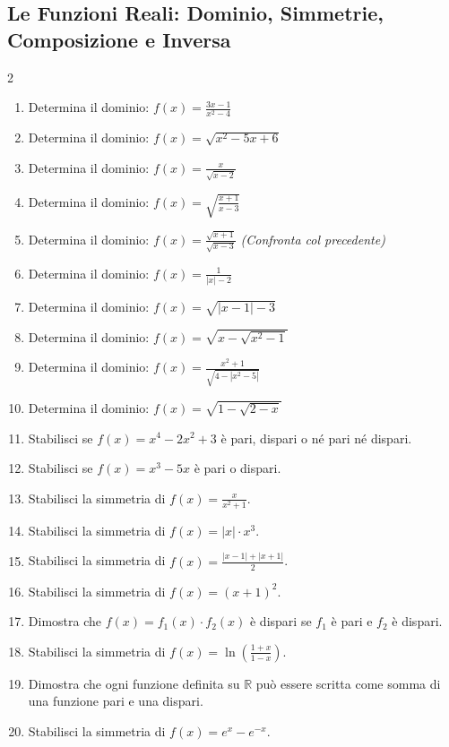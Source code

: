 \subsection{Le Funzioni Reali: Dominio, Simmetrie, Composizione e Inversa}
\begin{multicols}{2}
\begin{enumerate}
    \item {} Determina il dominio: $f(x) = \frac{3x - 1}{x^2 - 4}$
    \item {} Determina il dominio: $f(x) = \sqrt{x^2 - 5x + 6}$
    \item {} Determina il dominio: $f(x) = \frac{x}{\sqrt{x - 2}}$
    \item {} Determina il dominio: $f(x) = \sqrt{\frac{x + 1}{x - 3}}$
    \item {} Determina il dominio: $f(x) = \frac{\sqrt{x+1}}{\sqrt{x-3}}$ \textit{(Confronta col precedente)}
    \item {} Determina il dominio: $f(x) = \frac{1}{|x| - 2}$
    \item {} Determina il dominio: $f(x) = \sqrt{|x-1| - 3}$
    \item {} Determina il dominio: $f(x) = \sqrt{x - \sqrt{x^2 - 1}}$
    \item {} Determina il dominio: $f(x) = \frac{x^2+1}{\sqrt{4 - |x^2-5|}}$
    \item {} Determina il dominio: $f(x) = \sqrt{1 - \sqrt{2 - x}}$
    
    \item {} Stabilisci se $f(x) = x^4 - 2x^2 + 3$ è pari, dispari o né pari né dispari.
    \item {} Stabilisci se $f(x) = x^3 - 5x$ è pari o dispari.
    \item {} Stabilisci la simmetria di $f(x) = \frac{x}{x^2 + 1}$.
    \item {} Stabilisci la simmetria di $f(x) = |x| \cdot x^3$.
    \item {} Stabilisci la simmetria di $f(x) = \frac{|x-1| + |x+1|}{2}$.
    \item {} Stabilisci la simmetria di $f(x) = (x+1)^2$.
    \item {} Dimostra che $f(x) = f_1(x) \cdot f_2(x)$ è dispari se $f_1$ è pari e $f_2$ è dispari.
    \item {} Stabilisci la simmetria di $f(x) = \ln\left(\frac{1+x}{1-x}\right)$.
    \item {} Dimostra che ogni funzione definita su $\mathbb{R}$ può essere scritta come somma di una funzione pari e una dispari.
    \item {} Stabilisci la simmetria di $f(x) = e^x - e^{-x}$.
    

\end{enumerate}
\end{multicols}
